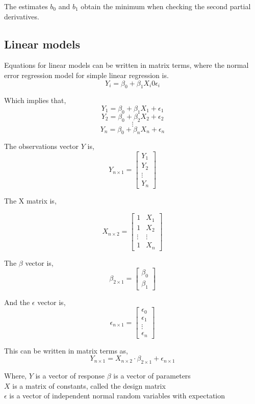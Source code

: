 	The estimates $b_0$ and $b_1$ obtain the minimum when checking the second partial derivatives. \newline
	
	
	\subsection{Linear models}
	
	Equations for linear models can be written in matrix terms, where the normal error regression model for simple linear regression is.
	$$Y_i = \beta_0 + \beta_1 X_i 0 \epsilon_i $$ 
	
	
	Which implies that,
	$$Y_1 = \beta_0 + \beta_1 X_1 + \epsilon_1$$
	$$Y_2 = \beta_0 + \beta_2 X_2 + \epsilon_2$$
	$$\vdots$$
	$$Y_n = \beta_0 + \beta_n X_n + \epsilon_n$$
	
	The observations vector $Y$ is,
	$$ Y_{n \times 1} =
	\left[
	\begin{array}{c}
		Y_1 \\ 
		Y_2 \\ 
		\vdots \\
		Y_n 
	\end{array}
	\right]
	$$	
	
	The X matrix is, 
	
	$$X_{n \times 2}=
	\left[
	\begin{array}{cc}
		1 & X_1 \\ 
		1 & X_2 \\ 
		\vdots & \vdots \\
		1 & X_n
	\end{array}
	\right]
	$$
	
	
	The $\beta$ vector is, 
	$$ \beta_{2 \times 1} =
	\left[
	\begin{array}{c}
		\beta_0 \\ 
		\beta_1 
	\end{array}
	\right]
	$$
	
	And the $\epsilon$ vector is,
	$$ \epsilon_{n \times 1} =
	\left[
	\begin{array}{c}
		\epsilon_0 \\ 
		\epsilon_1 \\
		\vdots \\
		\epsilon_n 
	\end{array}
	\right]
	$$
	
	This can be written in matrix terms as, 
	$$Y_{n \times 1}=X_{n \times 2} \cdot \beta_{2 \times 1} + \epsilon_{n \times 1}$$	
	
	Where, \newline
	\textbf{$Y$} is a vector of response \newline
	\textbf{$\beta$} is a vector of parameters \\
	\textbf{$X$} is a matrix of constants, called the design matrix\\
	\textbf{$\epsilon$} is a vector of independent normal random variables with expectation\\
	

